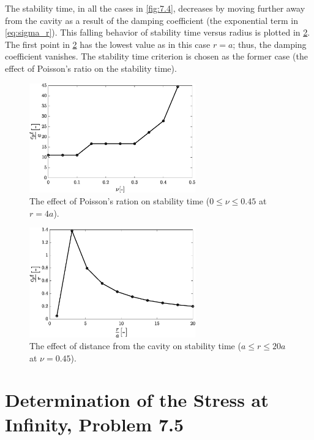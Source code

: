 \documentclass{article}
\begin{document}
The stability time, in all the cases in \cref{fig:7.4}, decreases by moving further away from the cavity as a result of the damping coefficient (the exponential term in \cref{eq:sigma_r}). This falling behavior of stability time versus radius is plotted in \cref{fig:7.4_r_t_plot}. The first point in \cref{fig:7.4_r_t_plot} has the lowest value as in this case $r=a$; thus, the damping coefficient vanishes. The stability time criterion is chosen as the former case (the effect of Poisson's ratio on the stability time).\\

\begin{figure}[H]
    \centering
    \includegraphics[width = 0.64\textwidth]{figures/v_t_plot.eps}
    \caption{The effect of Poisson's ration on stability time ($0 \leq \nu \leq 0.45$ at $r=4a$).}
    \label{fig:7.4_v_t_plot}
\end{figure}

\begin{figure}[H]
    \centering
    \includegraphics[width = 0.64\textwidth]{figures/r_t_plot.eps}
    \caption{The effect of distance from the cavity on stability time ($a \leq r \leq20a$ at $\nu=0.45$).}
    \label{fig:7.4_r_t_plot}
\end{figure}

\section{Determination of the Stress at Infinity, Problem 7.5}
\end{document}
